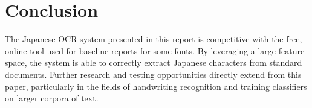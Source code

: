 \documentclass[10pt,twocolumn,letterpaper]{article}
\begin{document}
\section{Conclusion}
The Japanese OCR system presented in this report is competitive with the free, online tool used for baseline reports for some fonts. By leveraging a large feature space, the system is able to correctly extract Japanese characters from standard documents. Further research and testing opportunities directly extend from this paper, particularly in the fields of handwriting recognition and training classifiers on larger corpora of text.

{\small


}
\end{document}
